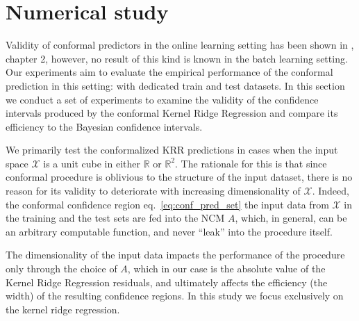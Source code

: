 \documentclass{ITaSconf}
\newcommand{\Xcal}{\mathcal{X}}
\newcommand{\Real}{\mathbb{R}}
\begin{document}





\section{Numerical study} %
\label{sec:numerical_study}

Validity of conformal predictors in the online learning setting has been shown in
\cite{vovk2005}, chapter 2, however, no result of this kind is known in the batch
learning setting. Our experiments aim to evaluate the empirical performance of the
conformal prediction in this setting: with dedicated train and test datasets. In
this section we conduct a set of experiments to examine the validity of the confidence
intervals produced by the conformal Kernel Ridge Regression and compare its efficiency
to the Bayesian confidence intervals.

We primarily test the conformalized KRR predictions in cases when the input space
$\Xcal$ is a unit cube in either $\Real$ or $\Real^2$. The rationale for this is
that since conformal procedure is oblivious to the structure of the input dataset,
there is no reason for its validity to deteriorate with increasing dimensionality
of $\Xcal$. Indeed, the conformal confidence region eq.~\ref{eq:conf_pred_set} the
input data from $\Xcal$ in the training and the test sets are fed into the NCM $A$,
which, in general, can be an arbitrary computable function, and never ``leak'' into
the procedure itself.

The dimensionality of the input data impacts the performance of the procedure only
through the choice of $A$, which in our case is the absolute value of the Kernel
Ridge Regression residuals, and ultimately affects the efficiency (the width) of
the resulting confidence regions. In this study we focus exclusively on the kernel
ridge regression.
\end{document}
